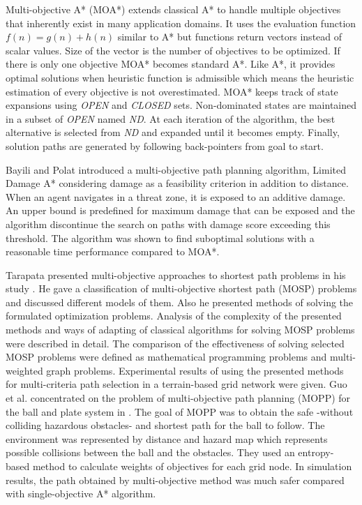 \documentclass[10pt, a4paper, conference, compsocconf]{IEEEtran}
\begin{document}
Multi-objective A* (MOA*) \cite{MOAStewart:1991} extends classical A* \cite{AStarHart:1968} to handle multiple objectives that inherently exist in many application domains. It uses the evaluation function $f(n)=g(n)+h(n)$ similar to A* but functions return vectors instead of scalar values. Size of the vector is the number of objectives to be optimized. If there is only one objective MOA* becomes standard A*. Like A*, it provides optimal solutions when heuristic function is admissible which means the heuristic estimation of every objective is not overestimated. MOA* keeps track of state expansions using {\it OPEN} and {\it CLOSED} sets. Non-dominated states are maintained in a subset of {\it OPEN} named {\it ND}. At each iteration of the algorithm, the best alternative is selected from {\it ND} and expanded until it becomes empty. Finally, solution paths are generated by following back-pointers from goal to start. 

Bayili and Polat introduced a multi-objective path planning algorithm, Limited Damage A*  \cite{LDAStarBayili:2008} considering damage as a feasibility criterion in addition to distance. When an agent navigates in a threat zone, it is exposed to an additive damage. An upper bound is predefined for maximum damage that can be exposed and the algorithm discontinue the search on paths with damage score exceeding this threshold. The algorithm was shown to find suboptimal solutions with a reasonable time performance compared to MOA*. 

Tarapata presented multi-objective approaches to shortest path problems in his study \cite{Tarapata:2007}. He gave a classification of multi-objective shortest path (MOSP) problems and discussed different models of them. Also he presented methods of solving the formulated optimization problems. Analysis of the complexity of the presented methods and ways of adapting of classical algorithms for solving MOSP problems were described in detail. The comparison of the effectiveness of solving selected MOSP problems were defined as mathematical programming problems and multi-weighted graph problems. Experimental results of using the presented methods for multi-criteria path selection in a terrain-based grid network were given. Guo et al. concentrated on the problem of multi-objective path planning (MOPP) for the ball and plate system in \cite{Guo:2009}. The goal of MOPP was to obtain the safe -without colliding hazardous obstacles- and shortest path for the ball to follow. The environment was represented by distance and hazard map which represents possible collisions between the ball and the obstacles. They used an entropy-based method to calculate weights of objectives for each grid node. In simulation results, the path obtained by multi-objective method was much safer compared with single-objective A* algorithm. 
\end{document}

